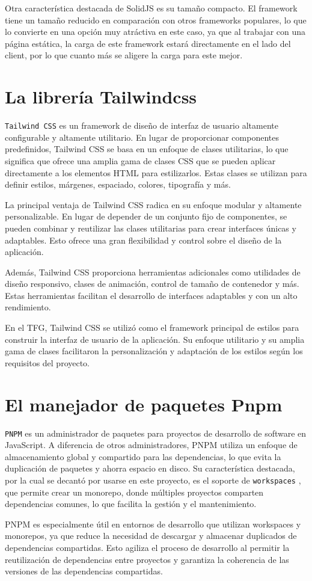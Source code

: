 Otra característica destacada de SolidJS es su tamaño compacto. El framework tiene un tamaño reducido en comparación con otros frameworks populares, lo que lo convierte en una opción muy atráctiva en este caso, ya que al trabajar con una página estática, la carga de este framework estará directamente en el lado del client, por lo que cuanto más se aligere la carga para este mejor.

\section{La librería Tailwindcss}
\verb|Tailwind CSS| \cite{tailwind} es un framework de diseño de interfaz de usuario altamente configurable y altamente utilitario. En lugar de proporcionar componentes predefinidos, Tailwind CSS se basa en un enfoque de clases utilitarias, lo que significa que ofrece una amplia gama de clases CSS que se pueden aplicar directamente a los elementos HTML para estilizarlos. Estas clases se utilizan para definir estilos, márgenes, espaciado, colores, tipografía y más.

La principal ventaja de Tailwind CSS radica en su enfoque modular y altamente personalizable. En lugar de depender de un conjunto fijo de componentes, se pueden combinar y reutilizar las clases utilitarias para crear interfaces únicas y adaptables. Esto ofrece una gran flexibilidad y control sobre el diseño de la aplicación.

Además, Tailwind CSS proporciona herramientas adicionales como utilidades de diseño responsivo, clases de animación, control de tamaño de contenedor y más. Estas herramientas facilitan el desarrollo de interfaces adaptables y con un alto rendimiento.

En el TFG, Tailwind CSS se utilizó como el framework principal de estilos para construir la interfaz de usuario de la aplicación. Su enfoque utilitario y su amplia gama de clases facilitaron la personalización y adaptación de los estilos según los requisitos del proyecto.

\section{El manejador de paquetes Pnpm}

\verb|PNPM| \cite{pnpm} es un administrador de paquetes para proyectos de desarrollo de software en JavaScript. A diferencia de otros administradores, PNPM utiliza un enfoque de almacenamiento global y compartido para las dependencias, lo que evita la duplicación de paquetes y ahorra espacio en disco. Su característica destacada, por la cual se decantó por usarse en este proyecto, es el soporte de \verb|workspaces| \cite{pnpm-workspaces}, que permite crear un monorepo, donde múltiples proyectos comparten dependencias comunes, lo que facilita la gestión y el mantenimiento.

PNPM es especialmente útil en entornos de desarrollo que utilizan workspaces y monorepos, ya que reduce la necesidad de descargar y almacenar duplicados de dependencias compartidas. Esto agiliza el proceso de desarrollo al permitir la reutilización de dependencias entre proyectos y garantiza la coherencia de las versiones de las dependencias compartidas.